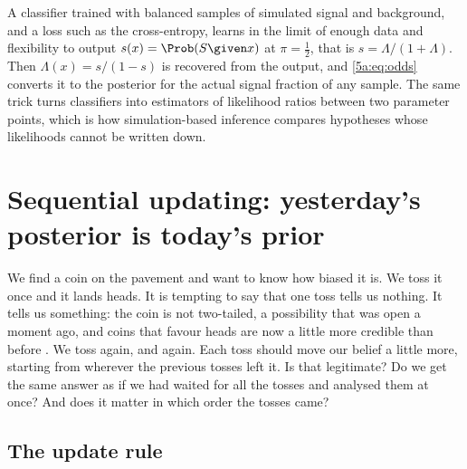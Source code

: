 \begin{inpractice}
A classifier trained with balanced samples of simulated signal and background, and a
loss such as the cross-entropy, learns in the limit of enough data and flexibility to
output $s(x)=\Prob(S\given x)$ at $\pi=\frac12$, that is
$s=\Lambda/(1+\Lambda)$. Then $\Lambda(x)=s/(1-s)$ is recovered from the output, and
\eqref{5a:eq:odds} converts it to the posterior for the actual signal fraction of any
sample. The same trick turns classifiers into estimators of likelihood ratios between
two parameter points, which is how simulation-based inference compares hypotheses
whose likelihoods cannot be written down.
\end{inpractice}
\section{Sequential updating: yesterday's posterior is today's prior}
\label{5a:sec:sequential}

We find a coin on the pavement and want to know how biased it is. We toss it once and
it lands heads. It is tempting to say that one toss tells us nothing. It tells us
something: the coin is not two-tailed, a possibility that was open a moment ago, and
coins that favour heads are now a little more credible than before
. We toss again, and again. Each toss should move our
belief a little more, starting from wherever the previous tosses left it. Is that
legitimate? Do we get the same answer as if we had waited for all the tosses and
analysed them at once? And does it matter in which order the tosses came?

\subsection{The update rule}

